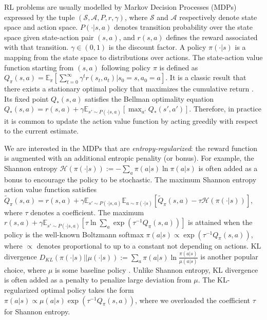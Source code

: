 \documentclass{article}
\newcommand{\AdaBracket}[1]{\left(#1\right)}
\newcommand{\AdaRectBracket}[1]{\left[#1\right]}
\newcommand{\expectation}[2]{\mathbb{E}_{#1}\AdaRectBracket{#2}}
\newcommand{\KLany}[2]{D_{\!K\!L}\!\left(#1 \left|  \right| #2 \right)}
\newcommand{\entropyany}[1]{\mathcal{H}\left( #1 \right)}
\begin{document}
RL problems are usually modelled by Markov Decision Processes (MDPs) expressed by the tuple $(\mathcal{S}, \mathcal{A}, P,  r,  \gamma)$, where $\mathcal{S}$ and $\mathcal{A}$ respectively denote state space and action space. 
$P(\cdot |s,a)$ denotes transition probability over the state space given state-action pair $(s,a)$,  
and $r(s,a)$ defines the reward associated with that transition. 
$\gamma \in (0,1)$ is the discount factor.
A policy $\pi(\cdot|s)$ is a mapping from the state space to distributions over actions.
The state-action value function starting from $(s, a)$ following policy $\pi$ is defined as  $Q_{\pi}(s,a) = \mathbb{E}_{\pi}\AdaRectBracket{\sum_{t=0}^{\infty} \gamma^t r(s_t, a_t) | s_0=s, a_0 = a }$.
It is a classic result that there exists a stationary optimal policy that maximizes the cumulative return \cite{Puterman1994}.
Its fixed point $Q_{*}(s,a)$ satisfies the Bellman optimality equation $Q_{*}(s,a) = r(s,a) + \gamma  \mathbb{E}_{s'\sim P(\cdot|s,a)}\!\AdaRectBracket{\max_{a'}Q_*(s',a')}$.
Therefore, in practice it is common to update the action value function by acting greedily with respect to the current estimate.


We are interested in the MDPs that are \emph{entropy-regularized}: the reward function is augmented with an additional entropic penality (or bonus).
For example, the Shannon entropy $\entropyany{\pi(\cdot| s)} := -\sum_a \pi(a|s)\ln \pi(a|s)$ is often added as a bonus to encourage the policy to be stochastic.
The maximum Shannon entropy action value function satisfies $\tilde{Q}_{\pi}(s,a) = r(s,a) + \gamma \mathbb{E}_{s' \sim P(\cdot | s,a )}\mathbb{E}_{a\sim \pi(\cdot|s)}\AdaRectBracket{\tilde{Q}_{\pi}(s,a) - \tau\entropyany{\pi(\cdot|s)}}$, where $\tau$ denotes a coefficient.
The maximum $r(s,a) + \gamma \expectation{s'\sim P(\cdot|s,a)}{\tau \ln\sum_{a} \exp\AdaBracket{\tau^{-1}Q_{\pi}(s,a)}}$ is attained when the policy is the well-known Boltzmann softmax $\pi(a|s) \propto \exp\AdaBracket{\tau^{-1}Q_{\pi}(s,a)}$, where $\propto$ denotes proportional to up to a constant not depending on actions.
KL divergence $\KLany{\pi(\cdot|s)}{\mu(\cdot|s)}:= \sum_a \pi(a|s)\ln\frac{\pi(a|s)}{\mu(a|s)}$ is another popular choice, where $\mu$ is some baseline policy \cite{azar2012dynamic,Rawlik2013-SOCRL,vieillard2020leverage}.
Unlike Shannon entropy, KL divergence is often added as a penalty to penalize large deviation from $\mu$.
The KL-regularized optimal policy takes the form $\pi(a|s) \propto \mu(a|s)\exp\AdaBracket{\tau^{-1}Q_{\pi}(s,a)}$, where we overloaded the coefficient $\tau$ for Shannon entropy.
\end{document}
